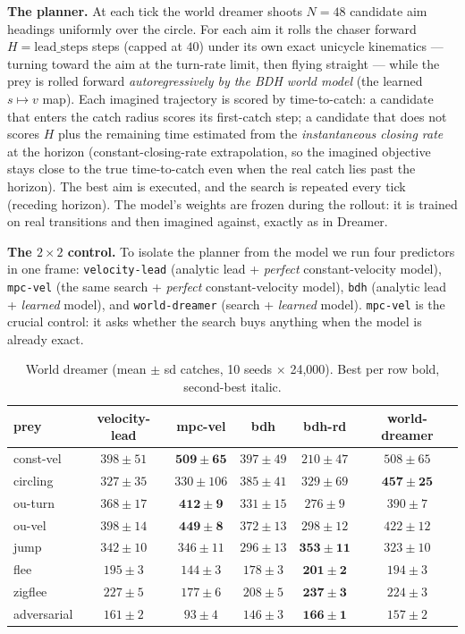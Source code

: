 \documentclass[11pt]{article}
\begin{document}
\textbf{The planner.} At each tick the world dreamer shoots $N = 48$ candidate aim headings
uniformly over the circle. For each aim it rolls the chaser forward $H = \text{lead\_steps}$ steps
(capped at $40$) under its own exact unicycle kinematics --- turning toward the aim at the turn-rate
limit, then flying straight --- while the prey is rolled forward \emph{autoregressively by the BDH
world model} (the learned $s \mapsto v$ map). Each imagined trajectory is scored by time-to-catch: a
candidate that enters the catch radius scores its first-catch step; a candidate that does not scores
$H$ plus the remaining time estimated from the \emph{instantaneous closing rate} at the horizon
(constant-closing-rate extrapolation, so the imagined objective stays close to the true time-to-catch
even when the real catch lies past the horizon). The best aim is executed, and the search is repeated
every tick (receding horizon). The model's weights are frozen during the rollout: it is trained on
real transitions and then imagined against, exactly as in Dreamer.

\textbf{The $2\times2$ control.} To isolate the planner from the model we run four predictors in one
frame: \texttt{velocity-lead} (analytic lead + \emph{perfect} constant-velocity model),
\texttt{mpc-vel} (the same search + \emph{perfect} constant-velocity model), \texttt{bdh} (analytic
lead + \emph{learned} model), and \texttt{world-dreamer} (search + \emph{learned} model).
\texttt{mpc-vel} is the crucial control: it asks whether the search buys anything when the model is
already exact.

\begin{table}[t]
\centering
\caption{World dreamer (mean $\pm$ sd catches, 10 seeds $\times$ 24{,}000). Best per row bold,
second-best italic.}
\label{tab:dreamer}
\small
\begin{tabular}{lccccc}
\toprule
prey & velocity-lead & mpc-vel & bdh & bdh-rd & world-dreamer \\
\midrule
const-vel   & $398 \pm 51$ & $\mathbf{509 \pm 65}$ & $397 \pm 49$ & $210 \pm 47$ & \emph{$508 \pm 65$} \\
circling    & $327 \pm 35$ & $330 \pm 106$ & \emph{$385 \pm 41$} & $329 \pm 69$ & $\mathbf{457 \pm 25}$ \\
ou-turn     & $368 \pm 17$ & $\mathbf{412 \pm 9}$ & $331 \pm 15$ & $276 \pm 9$ & \emph{$390 \pm 7$} \\
ou-vel      & $398 \pm 14$ & $\mathbf{449 \pm 8}$ & $372 \pm 13$ & $298 \pm 12$ & \emph{$422 \pm 12$} \\
jump        & $342 \pm 10$ & \emph{$346 \pm 11$} & $296 \pm 13$ & $\mathbf{353 \pm 11}$ & $323 \pm 10$ \\
flee        & \emph{$195 \pm 3$} & $144 \pm 3$ & $178 \pm 3$ & $\mathbf{201 \pm 2}$ & $194 \pm 3$ \\
zigflee     & \emph{$227 \pm 5$} & $177 \pm 6$ & $208 \pm 5$ & $\mathbf{237 \pm 3}$ & $224 \pm 3$ \\
adversarial & \emph{$161 \pm 2$} & $93 \pm 4$ & $146 \pm 3$ & $\mathbf{166 \pm 1}$ & $157 \pm 2$ \\
\bottomrule
\end{tabular}
\end{table}
\end{document}

